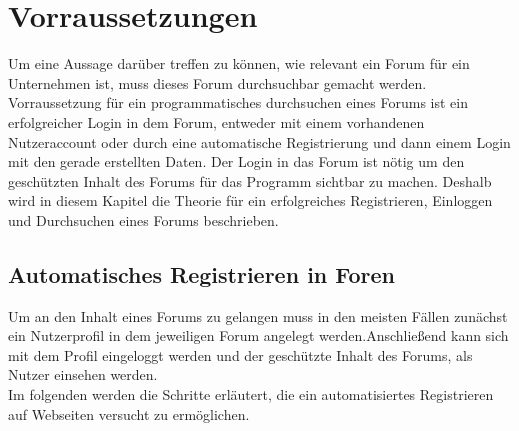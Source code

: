 \section{Vorraussetzungen}
Um eine Aussage darüber treffen zu können, wie relevant ein Forum für ein Unternehmen ist, muss dieses Forum durchsuchbar gemacht werden.
Vorraussetzung für ein programmatisches durchsuchen eines Forums ist ein erfolgreicher Login in dem Forum, entweder mit einem vorhandenen Nutzeraccount oder durch eine automatische Registrierung und dann einem Login mit den gerade erstellten Daten.
Der Login in das Forum ist nötig um den geschützten Inhalt des Forums für das Programm sichtbar zu machen. Deshalb wird in diesem Kapitel die Theorie für ein erfolgreiches Registrieren, Einloggen und Durchsuchen eines Forums beschrieben.

\subsection {Automatisches Registrieren in Foren}
Um an den Inhalt eines Forums zu gelangen muss in den meisten Fällen zunächst ein Nutzerprofil in dem jeweiligen Forum angelegt werden.Anschließend kann sich mit dem Profil eingeloggt werden und der geschützte Inhalt des Forums, als Nutzer einsehen werden. \\
Im folgenden werden die Schritte erläutert, die ein automatisiertes Registrieren auf Webseiten versucht zu ermöglichen.
